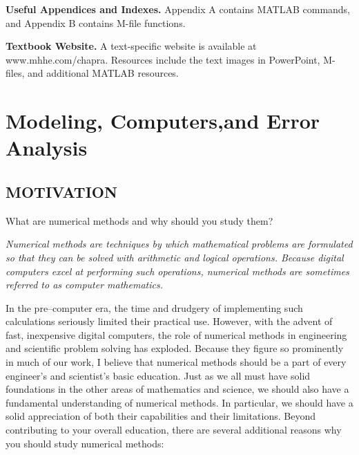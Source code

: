 \documentclass[../main.tex]{subfiles}
\begin{document}
\textbf{Useful Appendices and Indexes.} Appendix A contains MATLAB commands, and
Appendix B contains M-file functions.

\textbf{Textbook Website.} A text-specific website is available at www.mhhe.com/chapra. Resources include the text images in PowerPoint, M-files, and additional MATLAB resources.
\blankpage




\part{Modeling, Computers,and Error Analysis}
\label{part:part1}

\chapter*{MOTIVATION}
\label{cha:cha1}
What are numerical methods and why should you study them?


\textsl{Numerical methods are techniques by which mathematical problems are formulated so
that they can be solved with arithmetic and logical operations. Because digital computers
excel at performing such operations, numerical methods are sometimes referred to as computer mathematics.}


In the pre–computer era, the time and drudgery of implementing such calculations
seriously limited their practical use. However, with the advent of fast, inexpensive digital
computers, the role of numerical methods in engineering and scientific problem solving
has exploded. Because they figure so prominently in much of our work, I believe that numerical methods should be a part of every engineer’s and scientist’s basic education. Just
as we all must have solid foundations in the other areas of mathematics and science, we
should also have a fundamental understanding of numerical methods. In particular, we should
have a solid appreciation of both their
capabilities and their limitations.
Beyond contributing to your overall
education, there are several additional
reasons why you should study numerical
methods:
\end{document}
